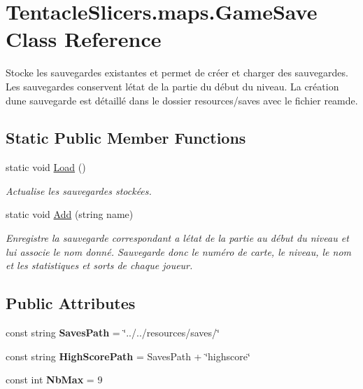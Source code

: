 \hypertarget{class_tentacle_slicers_1_1maps_1_1_game_save}{}\section{Tentacle\+Slicers.\+maps.\+Game\+Save Class Reference}
\label{class_tentacle_slicers_1_1maps_1_1_game_save}


Stocke les sauvegardes existantes et permet de créer et charger des sauvegardes. Les sauvegardes conservent l\textquotesingle{}état de la partie du début du niveau. La création d\textquotesingle{}une sauvegarde est détaillé dans le dossier resources/saves avec le fichier reamde.  


\subsection*{Static Public Member Functions}
\begin{DoxyCompactItemize}
\item 
static void \hyperlink{class_tentacle_slicers_1_1maps_1_1_game_save_a49db144314552baaa5cb4b3cf99544c4}{Load} ()
\begin{DoxyCompactList}\small\item\em Actualise les sauvegardes stockées. \end{DoxyCompactList}\item 
static void \hyperlink{class_tentacle_slicers_1_1maps_1_1_game_save_ad3b968abab5f585683e076a6d4725d4f}{Add} (string name)
\begin{DoxyCompactList}\small\item\em Enregistre la sauvegarde correspondant a l\textquotesingle{}état de la partie au début du niveau et lui associe le nom donné. Sauvegarde donc le numéro de carte, le niveau, le nom et les statistiques et sorts de chaque joueur. \end{DoxyCompactList}\end{DoxyCompactItemize}
\subsection*{Public Attributes}
\begin{DoxyCompactItemize}
\item 
\mbox{\label{class_tentacle_slicers_1_1maps_1_1_game_save_a8aeacde66fe4ede7bf84aa2fe9382a5f}} 
const string {\bfseries Saves\+Path} = \char`\"{}../../resources/saves/\char`\"{}
\item 
\mbox{\label{class_tentacle_slicers_1_1maps_1_1_game_save_ad4600816f1de2ffe075fd14df0198408}} 
const string {\bfseries High\+Score\+Path} = Saves\+Path + \char`\"{}highscore\char`\"{}
\item 
\mbox{\label{class_tentacle_slicers_1_1maps_1_1_game_save_a214dfb7300233e3edfe25ef328544a6d}} 
const int {\bfseries Nb\+Max} = 9
\end{DoxyCompactItemize}
